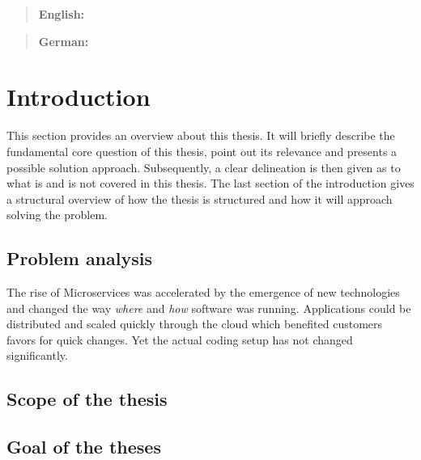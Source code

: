 \documentclass[12pt, a4paper]{article}
\begin{document}


\tableofcontents
\newpage

\setcounter{lastroman}{\value{page}}

\maketitle
\begin{abstract}
    \textbf{English:} \lipsum[20]
\end{abstract}
\begin{abstract}
    \textbf{German:} \lipsum[20]
\end{abstract}
\newpage

\section{Introduction}\label{sec::intro}
This section provides an overview about this thesis. It will briefly describe the fundamental core question of this thesis, point out its relevance and presents a possible solution approach. Subsequently, a clear delineation is then given as to what is and is not covered in this thesis. The last section of the introduction gives a structural overview of how the thesis is structured and how it will approach solving the problem.
    \subsection{Problem analysis}
    The rise of Microservices was accelerated by the emergence of new technologies and changed the way \textit{where} and \textit{how} software was running. Applications could be distributed and scaled quickly through the cloud which benefited customers favors for quick changes. Yet the actual coding setup has not changed significantly.\newline

    \subsection{Scope of the thesis}
    \subsection{Goal of the theses}
\end{document}
